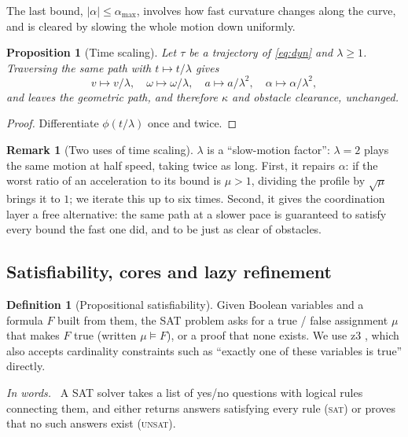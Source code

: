 \documentclass[conference]{IEEEtran}
\theoremstyle{plain}
\newtheorem{proposition}{Proposition}
\theoremstyle{definition}
\newtheorem{definition}{Definition}
\newtheorem{remark}{Remark}
\newcommand{\inwords}{\par\smallskip\noindent\textit{In words.}\ }
\begin{document}
The last bound, $|\alpha| \le \alpha_{\max}$, involves how fast curvature changes along the
curve, and is cleared by slowing the whole motion down uniformly.

\begin{proposition}[Time scaling]
\label{prop:scale}
Let $\tau$ be a trajectory of \eqref{eq:dyn} and $\lambda \ge 1$. Traversing the same path
with $t \mapsto t/\lambda$ gives
\[
  v \mapsto v/\lambda, \quad \omega \mapsto \omega/\lambda, \quad
  a \mapsto a/\lambda^2, \quad \alpha \mapsto \alpha/\lambda^2 ,
\]
and leaves the geometric path, and therefore $\kappa$ and obstacle clearance, unchanged.
\end{proposition}

\begin{proof}
Differentiate $\phi(t/\lambda)$ once and twice.
\end{proof}

\begin{remark}[Two uses of time scaling]
\label{rem:scale}
$\lambda$ is a ``slow-motion factor'': $\lambda = 2$ plays the same motion at half speed,
taking twice as long. First, it repairs $\alpha$: if the worst ratio of an acceleration to
its bound is $\mu > 1$, dividing the profile by $\sqrt{\mu}$ brings it to $1$; we iterate
this up to six times. Second, it gives the coordination layer a free alternative: the same
path at a slower pace is guaranteed to satisfy every bound the fast one did, and to be just
as clear of obstacles.
\end{remark}

\subsection{Satisfiability, cores and lazy refinement}
\label{sec:prelim-sat}

\begin{definition}[Propositional satisfiability]
Given Boolean variables and a formula $F$ built from them, the SAT problem asks for a true /
false assignment $\mu$ that makes $F$ true (written $\mu \models F$), or a proof that none
exists. We use z3 \cite{z3}, which also accepts cardinality constraints such as ``exactly
one of these variables is true'' directly.
\inwords
A SAT solver takes a list of yes/no questions with logical rules connecting them, and
either returns answers satisfying every rule (\textsc{sat}) or proves that no such answers
exist (\textsc{unsat}).
\end{definition}
\end{document}

